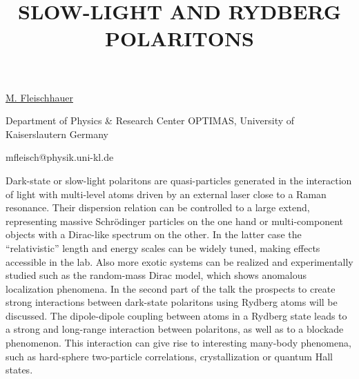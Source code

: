 \title{SLOW-LIGHT AND RYDBERG POLARITONS}

\underline{M. Fleischhauer}

{\normalsize{

\vspace{-4mm} Department of Physics \& Research Center OPTIMAS, University of Kaiserslautern
Germany

\email mfleisch@physik.uni-kl.de}}

Dark-state or slow-light polaritons are quasi-particles generated
in the interaction of light with multi-level atoms driven
by an external laser close to a Raman resonance. Their
dispersion relation can be controlled to a large extend,
representing massive Schr\"{o}dinger particles
on the one hand or multi-component objects with
a Dirac-like spectrum on the other. In the latter case
the ``relativistic'' length and energy scales can be widely tuned,
making effects accessible in the lab. Also more exotic systems can
be realized and experimentally studied such as
the random-mass Dirac model, which shows anomalous
localization phenomena. In the second part of the talk the prospects to
create strong interactions between dark-state polaritons using Rydberg atoms
will be discussed. The dipole-dipole coupling between atoms in a Rydberg state
leads to a strong and long-range interaction between polaritons, as well
as to a blockade phenomenon. This interaction can give rise to
interesting many-body phenomena, such as hard-sphere two-particle correlations,
crystallization or quantum Hall states.

\vspace{\baselineskip}
